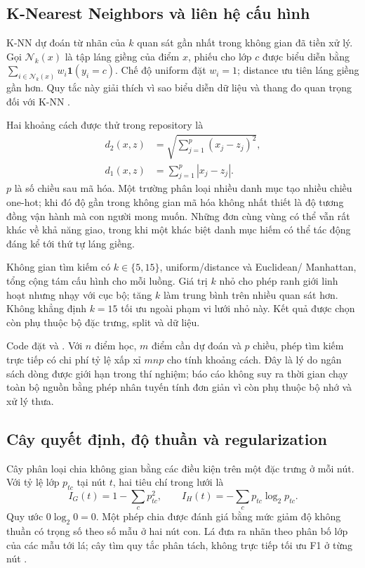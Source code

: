 \subsection{K-Nearest Neighbors và liên hệ cấu hình}
K-NN dự đoán từ nhãn của $k$ quan sát gần nhất trong không gian đã tiền xử
lý. Gọi $\mathcal N_k(x)$ là tập láng giềng của điểm $x$, phiếu cho lớp $c$
được biểu diễn bằng $\sum_{i\in\mathcal N_k(x)}w_i\mathbf1(y_i=c)$.
Chế độ uniform đặt $w_i=1$; distance ưu tiên láng giềng gần hơn. Quy tắc
này giải thích vì sao biểu diễn dữ liệu và thang đo quan trọng đối với
K-NN \cite{knn}.

Hai khoảng cách được thử trong repository là
\begin{align}
d_2(x,z)&=\sqrt{\sum_{j=1}^{p}(x_j-z_j)^2},\\
d_1(x,z)&=\sum_{j=1}^{p}|x_j-z_j|.
\end{align}
$p$ là số chiều sau mã hóa. Một trường phân loại nhiều danh mục tạo nhiều
chiều one-hot; khi đó độ gần trong không gian mã hóa không nhất thiết là
độ tương đồng vận hành mà con người mong muốn. Những đơn cùng vùng có thể
vẫn rất khác về khả năng giao, trong khi một khác biệt danh mục hiếm có
thể tác động đáng kể tới thứ tự láng giềng.

Không gian tìm kiếm có $k\in\{5,15\}$, uniform/distance và Euclidean/
Manhattan, tổng cộng tám cấu hình cho mỗi luồng. Giá trị $k$ nhỏ cho phép
ranh giới linh hoạt nhưng nhạy với cục bộ; tăng $k$ làm trung bình trên
nhiều quan sát hơn. Không khẳng định $k=15$ tối ưu ngoài phạm vi lưới nhỏ
này. Kết quả được chọn còn phụ thuộc bộ đặc trưng, split và dữ liệu.

Code đặt  và . Với $n$ điểm học,
$m$ điểm cần dự đoán và $p$ chiều, phép tìm kiếm trực tiếp có chi phí tỷ lệ
xấp xỉ $mnp$ cho tính khoảng cách. Đây là lý do ngân sách dòng được giới
hạn trong thí nghiệm; báo cáo không suy ra thời gian chạy toàn bộ nguồn
bằng phép nhân tuyến tính đơn giản vì còn phụ thuộc bộ nhớ và xử lý thưa.

\subsection{Cây quyết định, độ thuần và regularization}
Cây phân loại chia không gian bằng các điều kiện trên một đặc trưng ở mỗi
nút. Với tỷ lệ lớp $p_{tc}$ tại nút $t$, hai tiêu chí trong lưới là
\begin{equation}
I_G(t)=1-\sum_c p_{tc}^2,\qquad
I_H(t)=-\sum_c p_{tc}\log_2 p_{tc}.
\end{equation}
Quy ước $0\log_2 0=0$. Một phép chia được đánh giá bằng mức giảm độ không
thuần có trọng số theo số mẫu ở hai nút con. Lá đưa ra nhãn theo phân bố
lớp của các mẫu tới lá; cây tìm quy tắc phân tách, không trực tiếp tối ưu
F1 ở từng nút \cite{tree}.


